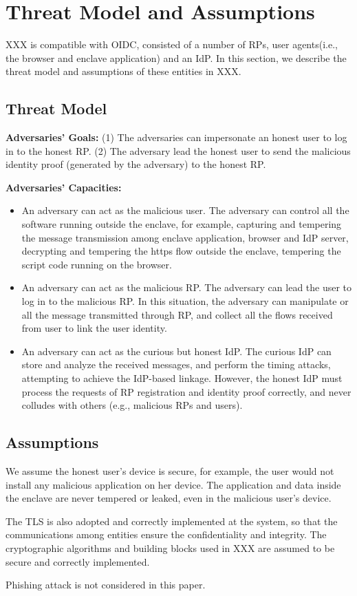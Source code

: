 \section{Threat Model and Assumptions}
XXX is compatible with OIDC, consisted of a number of RPs, user agents(i.e., the browser and enclave application) and an IdP. In this section, we describe the threat model and assumptions of these entities in XXX.
\subsection{Threat Model}
\noindent\textbf{Adversaries' Goals: } (1) The adversaries can impersonate an honest user to log in to the honest RP. (2) The adversary lead the honest user to send the malicious identity proof (generated by the adversary) to the honest RP. 

\noindent\textbf{Adversaries' Capacities: }
\begin{itemize}
\item An adversary can act as the malicious user. The adversary can control all the software running outside the enclave, for example, capturing and tempering the message transmission among enclave application, browser and IdP server, decrypting and tempering the https flow outside the enclave, tempering the script code running on the browser.
\item An adversary can act as the malicious RP. The adversary can lead the user to log in to the malicious RP. In this situation, the adversary can manipulate or all the message transmitted through RP, and collect all the flows received from user to link the user identity.
\item An adversary can act as the curious but honest IdP. The curious IdP can store and analyze the received messages, and perform the timing attacks, attempting to achieve the IdP-based linkage. However, the honest IdP must process the requests of RP registration and identity proof correctly, and never colludes with others (e.g., malicious RPs and users).
\end{itemize}

\subsection{Assumptions}
We assume the honest user's device is secure, for example, the user would not install any malicious application on her device. The application and data inside the enclave are never tempered or leaked, even in the malicious user's device.

The TLS is also adopted and correctly implemented at the system, so that the communications among entities ensure the confidentiality and integrity.
The cryptographic algorithms and building blocks used in XXX are assumed to be secure and correctly implemented. 

Phishing attack is not considered in this paper.

